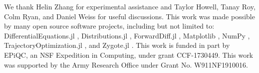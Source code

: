 \begin{acknowledgments}
  We thank Helin Zhang for experimental assistance
  and Taylor Howell, Tanay Roy, Colm Ryan, and Daniel Weiss for useful discussions.
  This work was made possible by many open source software projects,
  including but not limited to:
  DifferentialEquations.jl \cite{rackauckas2017differentialequations},
  Distributions.jl \cite{besancon2019distributions},
  ForwardDiff.jl \cite{revelsLubinPapamarkou2016},
  Matplotlib \cite{hunter2007matplotlib},
  NumPy \cite{harris2020array},
  TrajectoryOptimization.jl \cite{howell2019altro},
  and Zygote.jl \cite{innes2018don}.
  This work is funded in part by EPiQC, an NSF Expedition in Computing, under grant CCF-1730449.
  This work was supported by the Army Research Office under Grant No. W911NF1910016.
\end{acknowledgments}

